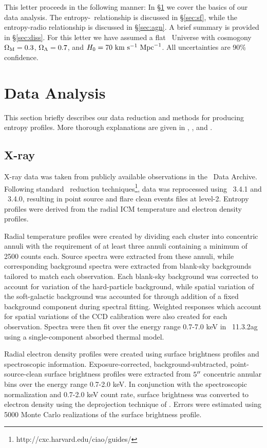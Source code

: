 \documentclass{emulateapj}
\begin{document}
This letter proceeds in the following manner: In \S\ref{sec:data} we
cover the basics of our data analysis. The
entropy-\halpha\ relationship is discussed in \S\ref{sec:sf}, while
the entropy-radio relationship is discussed in \S\ref{sec:agn}. A
brief summary is provided in \S\ref{sec:diss}. For this letter we
have assumed a flat \LCDM\ Universe with cosmogony $\Omega_{\mathrm{M}}=0.3$,
$\Omega_{\mathrm{\Lambda}}=0.7$, and $H_0=70\mbox{\ensuremath{\mathrm{~km}}}\mathrm{\mbox{\ensuremath{\mathrm{~s}}}^{-1}}\mathrm{\mbox{\ensuremath{\mathrm{~Mpc}}}^{-1}}$. All uncertainties are 90\%
confidence.

\section{Data Analysis}
\label{sec:data}

This section briefly describes our data reduction and methods for
producing entropy profiles. More thorough explanations are given in
\cite{d06}, \cite{accept}, and \cite{xrayband}.

\subsection{X-ray}
\label{sec:xray}

X-ray data was taken from publicly available observations in the
\Chandra\ Data Archive. Following standard \Ciao\ reduction
techniques\footnote{http://cxc.harvard.edu/ciao/guides/}, data was
reprocessed using \Ciao\ 3.4.1 and \Caldb\ 3.4.0, resulting in point
source and flare clean events files at level-2. Entropy profiles were
derived from the radial ICM temperature and electron density profiles.

Radial temperature profiles were created by dividing each cluster into
concentric annuli with the requirement of at least three annuli
containing a minimum of 2500 counts each. Source spectra were
extracted from these annuli, while corresponding background spectra
were extracted from blank-sky backgrounds tailored to match each
observation. Each blank-sky background was corrected to account for
variation of the hard-particle background, while spatial variation of
the soft-galactic background was accounted for through addition of a
fixed background component during spectral fitting. Weighted responses
which account for spatial variations of the CCD calibration were also
created for each observation. Spectra were then fit over the energy
range 0.7-7.0 keV in \xspec\ 11.3.2ag \citep{xspec} using a
single-component absorbed thermal model.

Radial electron density profiles were created using surface brightness
profiles and spectroscopic information. Exposure-corrected,
background-subtracted, point-source-clean surface brightness profiles
were extracted from $5\mbox{$^{\prime\prime}$}$ concentric annular bins over the energy
range 0.7-2.0 keV. In conjunction with the spectroscopic normalization
and 0.7-2.0 keV count rate, surface brightness was converted to
electron density using the deprojection technique of
\cite{kriss83}. Errors were estimated using 5000 Monte Carlo
realizations of the surface brightness profile.
\end{document}
